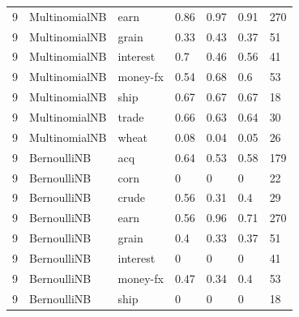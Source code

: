 \documentclass{article}
\begin{document}
\begin{table}[H]
\begin{tabular}{lllllll}
9             & MultinomialNB          & earn            & 0.86               & 0.97            & 0.91              & 270              \\
9             & MultinomialNB          & grain           & 0.33               & 0.43            & 0.37              & 51               \\
9             & MultinomialNB          & interest        & 0.7                & 0.46            & 0.56              & 41               \\
9             & MultinomialNB          & money-fx        & 0.54               & 0.68            & 0.6               & 53               \\
9             & MultinomialNB          & ship            & 0.67               & 0.67            & 0.67              & 18               \\
9             & MultinomialNB          & trade           & 0.66               & 0.63            & 0.64              & 30               \\
9             & MultinomialNB          & wheat           & 0.08               & 0.04            & 0.05              & 26               \\
9             & BernoulliNB            & acq             & 0.64               & 0.53            & 0.58              & 179              \\
9             & BernoulliNB            & corn            & 0                  & 0               & 0                 & 22               \\
9             & BernoulliNB            & crude           & 0.56               & 0.31            & 0.4               & 29               \\
9             & BernoulliNB            & earn            & 0.56               & 0.96            & 0.71              & 270              \\
9             & BernoulliNB            & grain           & 0.4                & 0.33            & 0.37              & 51               \\
9             & BernoulliNB            & interest        & 0                  & 0               & 0                 & 41               \\
9             & BernoulliNB            & money-fx        & 0.47               & 0.34            & 0.4               & 53               \\
9             & BernoulliNB            & ship            & 0                  & 0               & 0                 & 18               \\

\end{tabular}
\end{table}
\end{document}
